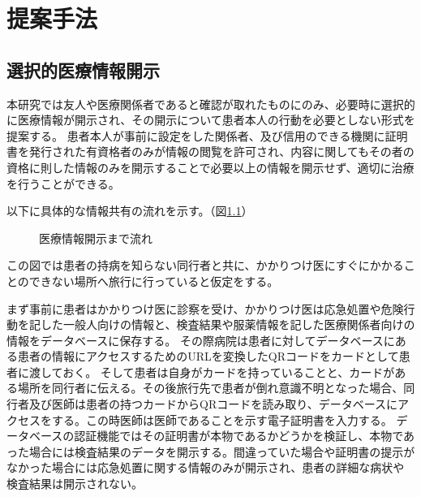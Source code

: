 \chapter{提案手法}
\label{chap:propose}


\section{選択的医療情報開示}
本研究では友人や医療関係者であると確認が取れたものにのみ、必要時に選択的に医療情報が開示され、その開示について患者本人の行動を必要としない形式を提案する。
患者本人が事前に設定をした関係者、及び信用のできる機関に証明書を発行された有資格者のみが情報の閲覧を許可され、内容に関してもその者の資格に則した情報のみを開示することで必要以上の情報を開示せず、適切に治療を行うことができる。




以下に具体的な情報共有の流れを示す。（図\ref{fig:sample1}）

\begin{figure}[htbp]
    \begin{center}
    \end{center}
    \caption{医療情報開示まで流れ}
    \label{fig:sample1}
\end{figure}




この図では患者の持病を知らない同行者と共に、かかりつけ医にすぐにかかることのできない場所へ旅行に行っていると仮定をする。


まず事前に患者はかかりつけ医に診察を受け、かかりつけ医は応急処置や危険行動を記した一般人向けの情報と、検査結果や服薬情報を記した医療関係者向けの情報をデータベースに保存する。
その際病院は患者に対してデータベースにある患者の情報にアクセスするためのURLを変換したQRコードをカードとして患者に渡しておく。
そして患者は自身がカードを持っていることと、カードがある場所を同行者に伝える。その後旅行先で患者が倒れ意識不明となった場合、同行者及び医師は患者の持つカードからQRコードを読み取り、データベースにアクセスをする。この時医師は医師であることを示す電子証明書を入力する。
データベースの認証機能ではその証明書が本物であるかどうかを検証し、本物であった場合には検査結果のデータを開示する。間違っていた場合や証明書の提示がなかった場合には応急処置に関する情報のみが開示され、患者の詳細な病状や検査結果は開示されない。



